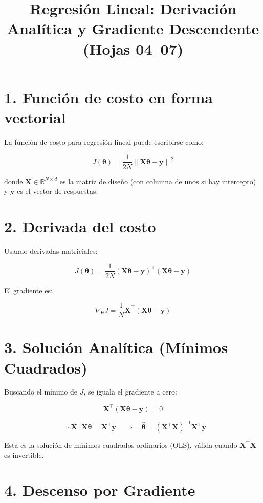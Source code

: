\documentclass[12pt]{article}
\title{Regresión Lineal: Derivación Analítica y Gradiente Descendente \\ (Hojas 04–07)}
\author{}
\date{}
\begin{document}
\maketitle

\section*{1. Función de costo en forma vectorial}

La función de costo para regresión lineal puede escribirse como:

\[
J(\boldsymbol{\theta}) = \frac{1}{2N} \left\| \boldsymbol{X} \boldsymbol{\theta} - \boldsymbol{y} \right\|^2
\]

donde $\boldsymbol{X} \in \mathbb{R}^{N \times d}$ es la matriz de diseño (con columna de unos si hay intercepto) y $\boldsymbol{y}$ es el vector de respuestas.

\section*{2. Derivada del costo}

Usando derivadas matriciales:

\[
J(\boldsymbol{\theta}) = \frac{1}{2N} (\boldsymbol{X} \boldsymbol{\theta} - \boldsymbol{y})^\top (\boldsymbol{X} \boldsymbol{\theta} - \boldsymbol{y})
\]

El gradiente es:

\[
\nabla_{\boldsymbol{\theta}} J = \frac{1}{N} \boldsymbol{X}^\top (\boldsymbol{X} \boldsymbol{\theta} - \boldsymbol{y})
\]

\section*{3. Solución Analítica (Mínimos Cuadrados)}

Buscando el mínimo de $J$, se iguala el gradiente a cero:

\[
\boldsymbol{X}^\top (\boldsymbol{X} \boldsymbol{\theta} - \boldsymbol{y}) = 0
\]

\[
\Rightarrow \boldsymbol{X}^\top \boldsymbol{X} \boldsymbol{\theta} = \boldsymbol{X}^\top \boldsymbol{y}
\quad \Rightarrow \quad
\hat{\boldsymbol{\theta}} = (\boldsymbol{X}^\top \boldsymbol{X})^{-1} \boldsymbol{X}^\top \boldsymbol{y}
\]

Esta es la solución de mínimos cuadrados ordinarios (OLS), válida cuando $\boldsymbol{X}^\top \boldsymbol{X}$ es invertible.

\section*{4. Descenso por Gradiente}
\end{document}
